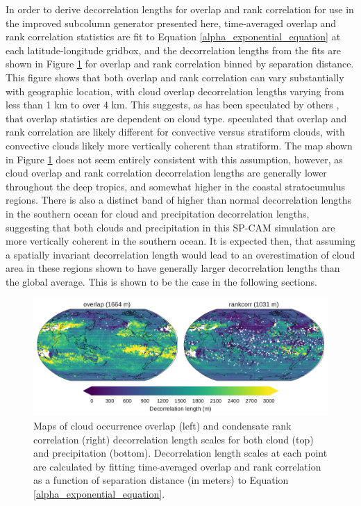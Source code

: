 In order to derive decorrelation lengths for overlap and rank correlation for use in the improved subcolumn generator presented here, time-averaged overlap and rank correlation statistics are fit to Equation \ref{alpha_exponential_equation} at each latitude-longitude gridbox, and the decorrelation lengths from the fits are shown in Figure \ref{subgrid2_overlap_maps} for overlap and rank correlation binned by separation distance. This figure shows that both overlap and rank correlation can vary substantially with geographic location, with cloud overlap decorrelation lengths varying from less than 1 km to over 4 km. This suggests, as has been speculated by others \citep[e.g.]{pincus_et_al_2005}, that overlap statistics are dependent on cloud type. \cite{pincus_et_al_2005} speculated that overlap and rank correlation are likely different for convective versus stratiform clouds, with convective clouds likely more vertically coherent than stratiform. The map shown in Figure \ref{subgrid2_overlap_maps} does not seem entirely consistent with this assumption, however, as cloud overlap and rank correlation decorrelation lengths are generally lower throughout the deep tropics, and somewhat higher in the coastal stratocumulus regions. There is also a distinct band of higher than normal decorrelation lengths in the southern ocean for cloud and precipitation decorrelation lengths, suggesting that both clouds and precipitation in this SP-CAM simulation are more vertically coherent in the southern ocean. It is expected then, that assuming a spatially invariant decorrelation length would lead to an overestimation of cloud area in these regions shown to have generally larger decorrelation lengths than the global average. This is shown to be the case in the following sections.

\begin{figure}
\centering
\includegraphics[width=\columnwidth]{graphics/subgrid2_overlap_maps.pdf}
\caption{Maps of cloud occurrence overlap (left) and condensate rank correlation (right) decorrelation length scales for both cloud (top) and precipitation (bottom). Decorrelation length scales at each point are calculated by fitting time-averaged overlap and rank correlation as a function of separation distance (in meters) to Equation \ref{alpha_exponential_equation}.}
\label{subgrid2_overlap_maps}
\end{figure}

